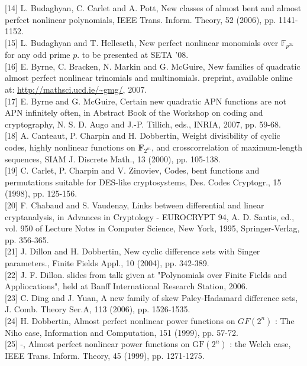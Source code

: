 \documentclass[10pt]{article}
\begin{document}
[14] L. Budaghyan, C. Carlet and A. Pott, New classes of almost bent and almost perfect nonlinear polynomials, IEEE Trans. Inform. Theory, 52 (2006), pp. 1141-1152.\\[0pt]
[15] L. Budaghyan and T. Helleseth, New perfect nonlinear monomials over $\mathbb{F}_{p^{2 k}}$ for any odd prime $p$. to be presented at SETA '08.\\[0pt]
[16] E. Byrne, C. Bracken, N. Markin and G. McGuire, New families of quadratic almost perfect nonlinear trinomials and multinomials. preprint, available online at: \href{http://mathsci.ucd.ie/~gmg/}{http://mathsci.ucd.ie/\~{}gmg/}, 2007.\\[0pt]
[17] E. Byrne and G. McGuire, Certain new quadratic APN functions are not APN infinitely often, in Abstract Book of the Workshop on coding and cryptography, N. S. D. Augo and J.-P. Tillich, eds., INRIA, 2007, pp. 59-68.\\[0pt]
[18] A. Canteaut, P. Charpin and H. Dobbertin, Weight divisibility of cyclic codes, highly nonlinear functions on $\mathbf{F}_{2^{m}}$, and crosscorrelation of maximum-length sequences, SIAM J. Discrete Math., 13 (2000), pp. 105-138.\\[0pt]
[19] C. Carlet, P. Charpin and V. Zinoviev, Codes, bent functions and permutations suitable for DES-like cryptosystems, Des. Codes Cryptogr., 15 (1998), pp. 125-156.\\[0pt]
[20] F. Chabaud and S. Vaudenay, Links between differential and linear cryptanalysis, in Advances in Cryptology - EUROCRYPT 94, A. D. Santis, ed., vol. 950 of Lecture Notes in Computer Science, New York, 1995, Springer-Verlag, pp. 356-365.\\[0pt]
[21] J. Dillon and H. Dobbertin, New cyclic difference sets with Singer parameters., Finite Fields Appl., 10 (2004), pp. 342-389.\\[0pt]
[22] J. F. Dillon. slides from talk given at "Polynomials over Finite Fields and Appliocations", held at Banff International Research Station, 2006.\\[0pt]
[23] C. Ding and J. Yuan, A new family of skew Paley-Hadamard difference sets, J. Comb. Theory Ser.A, 113 (2006), pp. 1526-1535.\\[0pt]
[24] H. Dobbertin, Almost perfect nonlinear power functions on $G F\left(2^{n}\right)$ : The Niho case, Information and Computation, 151 (1999), pp. 57-72.\\[0pt]
[25] -, Almost perfect nonlinear power functions on $\mathrm{GF}\left(2^{n}\right)$ : the Welch case, IEEE Trans. Inform. Theory, 45 (1999), pp. 1271-1275.\\[0pt]
\end{document}
